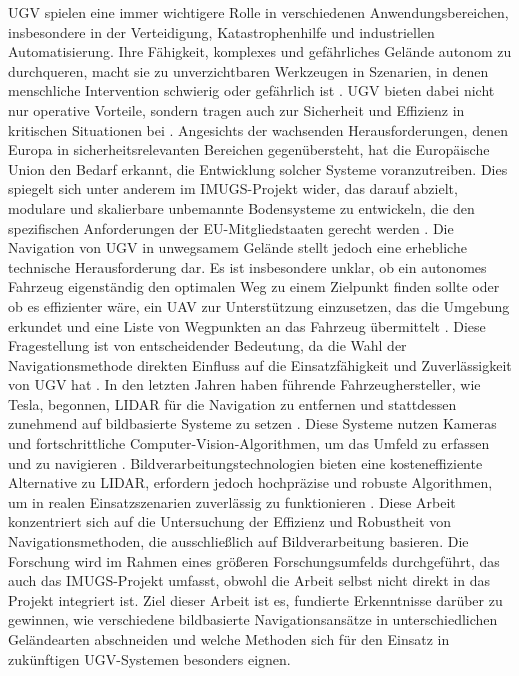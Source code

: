 \ac{UGV} spielen eine immer wichtigere Rolle in verschiedenen Anwendungsbereichen, insbesondere in der Verteidigung, Katastrophenhilfe und industriellen Automatisierung. 
Ihre Fähigkeit, komplexes und gefährliches Gelände autonom zu durchqueren, macht sie zu unverzichtbaren Werkzeugen in Szenarien, in denen menschliche Intervention schwierig oder gefährlich ist \cite{uav:ugv:search:rescue}. 
\ac{UGV} bieten dabei nicht nur operative Vorteile, sondern tragen auch zur Sicherheit und Effizienz in kritischen Situationen bei \cite{ugv:system:indonesia}. 
Angesichts der wachsenden Herausforderungen, denen Europa in sicherheitsrelevanten Bereichen gegenübersteht, hat die Europäische Union den Bedarf erkannt, die Entwicklung solcher Systeme voranzutreiben. 
Dies spiegelt sich unter anderem im \ac{IMUGS}-Projekt wider, das darauf abzielt, modulare und skalierbare unbemannte Bodensysteme zu entwickeln, die den spezifischen Anforderungen der EU-Mitgliedstaaten gerecht werden \cite{mil:ugv:attitudes}.
Die Navigation von \ac{UGV} in unwegsamem Gelände stellt jedoch eine erhebliche technische Herausforderung dar. 
Es ist insbesondere unklar, ob ein autonomes Fahrzeug eigenständig den optimalen Weg zu einem Zielpunkt finden sollte oder ob es effizienter wäre, ein \ac{UAV} zur Unterstützung einzusetzen, das die Umgebung erkundet und eine Liste von Wegpunkten an das Fahrzeug übermittelt \cite{ugv:coverage:energy:efficient}. 
Diese Fragestellung ist von entscheidender Bedeutung, da die Wahl der Navigationsmethode direkten Einfluss auf die Einsatzfähigkeit und Zuverlässigkeit von \ac{UGV} hat \cite{ugv:uav:cooperative:ranging}.
In den letzten Jahren haben führende Fahrzeughersteller, wie Tesla, begonnen, \gls{LIDAR} für die Navigation zu entfernen und stattdessen zunehmend auf bildbasierte Systeme zu setzen \cite{website:tesla:suppport}. 
Diese Systeme nutzen Kameras und fortschrittliche Computer-Vision-Algorithmen, um das Umfeld zu erfassen und zu navigieren \cite{website:tesla:suppport}. 
Bildverarbeitungstechnologien bieten eine kosteneffiziente Alternative zu \gls{LIDAR}, erfordern jedoch hochpräzise und robuste Algorithmen, um in realen Einsatzszenarien zuverlässig zu funktionieren \cite{mil:ugv:attitudes}.
Diese Arbeit konzentriert sich auf die Untersuchung der Effizienz und Robustheit von Navigationsmethoden, die ausschließlich auf Bildverarbeitung basieren. 
Die Forschung wird im Rahmen eines größeren Forschungsumfelds durchgeführt, das auch das \ac{IMUGS}-Projekt umfasst, obwohl die Arbeit selbst nicht direkt in das Projekt integriert ist. 
Ziel dieser Arbeit ist es, fundierte Erkenntnisse darüber zu gewinnen, wie verschiedene bildbasierte Navigationsansätze in unterschiedlichen Geländearten abschneiden und welche Methoden sich für den Einsatz in zukünftigen \ac{UGV}-Systemen besonders eignen.

